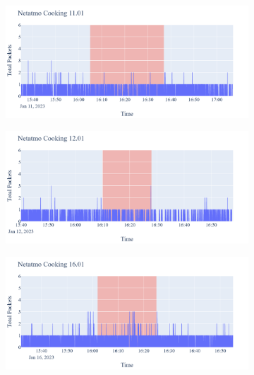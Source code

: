\begin{figure}[H]
    \begin{subfigure}[b]{0.47\textwidth}
        \centering
        \includegraphics[width=1.2\hsize]{figures/Netatmo_Cooking_Packets_11.01.png}
    \end{subfigure}
    \begin{subfigure}[b]{0.47\textwidth}
        \centering
        \includegraphics[width=1.2\hsize]{figures/Netatmo_Cooking_Packets_12.01.png}
    \end{subfigure}
    \begin{subfigure}[b]{0.47\textwidth}
        \centering
        \includegraphics[width=1.2\hsize]{figures/Netatmo_Cooking_Packets_16.01.png}
    \end{subfigure}
    \begin{subfigure}[b]{0.47\textwidth}

\end{subfigure}
\end{figure}
